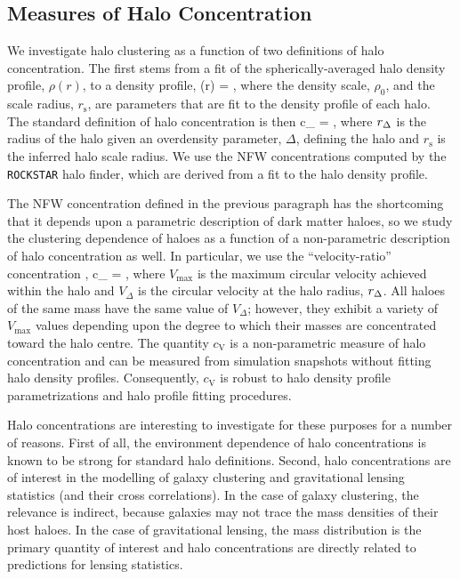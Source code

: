 \documentclass[usenatbib,fleqn]{mnras}
\begin{document}
\subsection{Measures of Halo Concentration}

We investigate halo clustering as a function of two definitions of halo concentration. The first stems from a fit of the spherically-averaged halo density profile, $\rho(r)$, to a \citet[hereafter NFW]{navarro_etal97} density profile, 
%
\beq
\rho(r) = ,
\eeq
%
where the density scale, $\rho_0$, and the scale radius, $r_{\mathrm{s}}$, are parameters that are fit to the density profile of each halo. The standard definition of halo concentration is then 
\beq
c_{} = ,
\eeq
where $r_{\Delta}$ is the radius of the halo given an overdensity parameter, $\Delta$, defining the halo and $r_{\mathrm{s}}$ is the inferred halo scale radius. We use the NFW concentrations computed by the {\tt ROCKSTAR} halo finder, which are derived from a fit to the halo density profile.  


The NFW concentration defined in the previous paragraph has the shortcoming that it 
depends upon a parametric description of dark matter haloes, so we study the clustering dependence of haloes as a function of a non-parametric description of halo concentration as well. In particular, we use the ``velocity-ratio'' concentration \citep{prada_etal12,klypin_etal16},
%
\beq
c_{} = , 
\eeq
%
where $V_{\mathrm{max}}$ is the maximum circular velocity achieved within the halo and $V_{\Delta}$ is the circular velocity at the halo radius, $r_{\Delta}$. All haloes of the same mass have the same value of $V_{\Delta}$; however, 
they exhibit a variety of $V_{\mathrm{max}}$ values depending upon the degree to which their masses are concentrated toward the halo centre. The quantity $c_{\mathrm{V}}$ is a non-parametric measure of halo concentration and can be measured from simulation snapshots without fitting halo density profiles. Consequently, $c_{\mathrm{V}}$ is robust to halo density profile parametrizations and halo profile fitting procedures. 

Halo concentrations are interesting to investigate for these purposes for a number of reasons. First of all, the environment dependence of halo concentrations is known to be strong for standard halo definitions. Second, halo concentrations are of interest in the modelling of galaxy clustering and gravitational lensing statistics (and their cross correlations). In the case of galaxy clustering, the relevance is indirect, because galaxies may not trace the mass densities of their host haloes. In the case of gravitational lensing, the mass distribution is the primary quantity of interest and halo concentrations are directly related to predictions for lensing statistics. 
\end{document}
